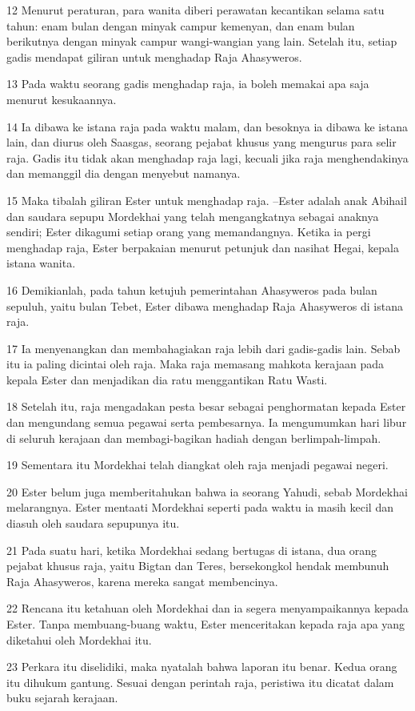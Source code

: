 \par 12 Menurut peraturan, para wanita diberi perawatan kecantikan selama satu tahun: enam bulan dengan minyak campur kemenyan, dan enam bulan berikutnya dengan minyak campur wangi-wangian yang lain. Setelah itu, setiap gadis mendapat giliran untuk menghadap Raja Ahasyweros.
\par 13 Pada waktu seorang gadis menghadap raja, ia boleh memakai apa saja menurut kesukaannya.
\par 14 Ia dibawa ke istana raja pada waktu malam, dan besoknya ia dibawa ke istana lain, dan diurus oleh Saasgas, seorang pejabat khusus yang mengurus para selir raja. Gadis itu tidak akan menghadap raja lagi, kecuali jika raja menghendakinya dan memanggil dia dengan menyebut namanya.
\par 15 Maka tibalah giliran Ester untuk menghadap raja. --Ester adalah anak Abihail dan saudara sepupu Mordekhai yang telah mengangkatnya sebagai anaknya sendiri; Ester dikagumi setiap orang yang memandangnya. Ketika ia pergi menghadap raja, Ester berpakaian menurut petunjuk dan nasihat Hegai, kepala istana wanita.
\par 16 Demikianlah, pada tahun ketujuh pemerintahan Ahasyweros pada bulan sepuluh, yaitu bulan Tebet, Ester dibawa menghadap Raja Ahasyweros di istana raja.
\par 17 Ia menyenangkan dan membahagiakan raja lebih dari gadis-gadis lain. Sebab itu ia paling dicintai oleh raja. Maka raja memasang mahkota kerajaan pada kepala Ester dan menjadikan dia ratu menggantikan Ratu Wasti.
\par 18 Setelah itu, raja mengadakan pesta besar sebagai penghormatan kepada Ester dan mengundang semua pegawai serta pembesarnya. Ia mengumumkan hari libur di seluruh kerajaan dan membagi-bagikan hadiah dengan berlimpah-limpah.
\par 19 Sementara itu Mordekhai telah diangkat oleh raja menjadi pegawai negeri.
\par 20 Ester belum juga memberitahukan bahwa ia seorang Yahudi, sebab Mordekhai melarangnya. Ester mentaati Mordekhai seperti pada waktu ia masih kecil dan diasuh oleh saudara sepupunya itu.
\par 21 Pada suatu hari, ketika Mordekhai sedang bertugas di istana, dua orang pejabat khusus raja, yaitu Bigtan dan Teres, bersekongkol hendak membunuh Raja Ahasyweros, karena mereka sangat membencinya.
\par 22 Rencana itu ketahuan oleh Mordekhai dan ia segera menyampaikannya kepada Ester. Tanpa membuang-buang waktu, Ester menceritakan kepada raja apa yang diketahui oleh Mordekhai itu.
\par 23 Perkara itu diselidiki, maka nyatalah bahwa laporan itu benar. Kedua orang itu dihukum gantung. Sesuai dengan perintah raja, peristiwa itu dicatat dalam buku sejarah kerajaan.

